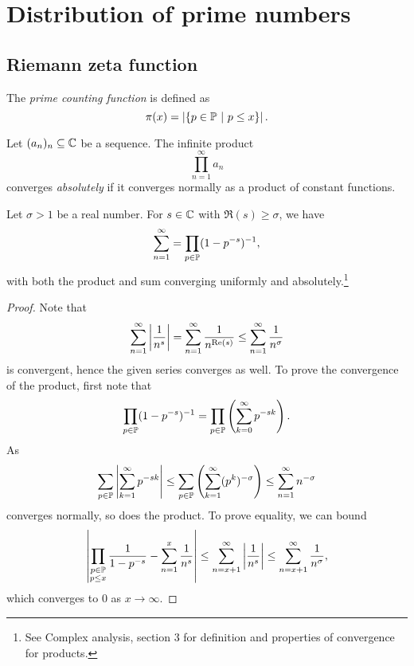 \section{Distribution of prime numbers}

\subsection{Riemann zeta function}


\begin{definicija}
The \emph{prime counting function}
is defined as
\[
\pi(x) = \abs{\setb{p \in \P}{p \leq x}}.
\]
\end{definicija}

\begin{definicija}
Let $(a_n)_n \subseteq \C$ be a sequence. The infinite product
\[
\prod_{n=1}^\infty a_n
\]
converges \emph{absolutely} if it
converges normally as a product of constant functions.
\end{definicija}

\begin{izrek}
Let $\sigma > 1$ be a real number. For $s \in \C$ with
$\Re(s) \geq \sigma$, we have
\[
\sum_{n=1}^\infty = \prod_{p \in \P} (1 - p^{-s})^{-1},
\]
with both the product and sum converging uniformly and
absolutely.\footnote{See Complex analysis, section 3 for definition
and properties of convergence for products.}
\end{izrek}

\begin{proof}
Note that
\[
\sum_{n=1}^\infty \abs{\frac{1}{n^s}} =
\sum_{n=1}^\infty \frac{1}{n^{\Re(s)}} \leq
\sum_{n=1}^\infty \frac{1}{n^\sigma}
\]
is convergent, hence the given series converges as well. To prove
the convergence of the product, first note that
\[
\prod_{p \in \P} (1-p^{-s})^{-1} =
\prod_{p \in \P} \br{\sum_{k=0}^\infty p^{-sk}}.
\]
As
\[
\sum_{p \in \P} \abs{\sum_{k=1}^\infty p^{-sk}} \leq
\sum_{p \in \P} \br{\sum_{k=1}^\infty (p^k)^{-\sigma}} \leq
\sum_{n=1}^\infty n^{-\sigma}
\]
converges normally, so does the product. To prove equality, we can
bound
\[
\abs{\prod_{\substack{p \in \P \\ p \leq x}}
\frac{1}{1 - p^{-s}} - \sum_{n=1}^x \frac{1}{n^s}} \leq
\sum_{n=x+1}^\infty \abs{\frac{1}{n^s}} \leq
\sum_{n=x+1}^\infty \frac{1}{n^\sigma},
\]
which converges to $0$ as $x \to \infty$.
\end{proof}

